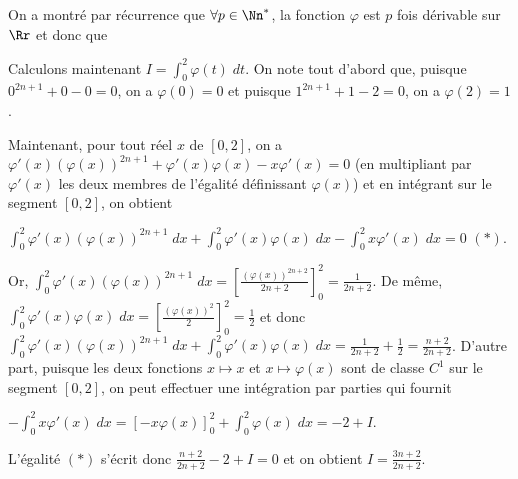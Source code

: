 {{On a montré par récurrence que $\forall p\in\Nn^*$, la fonction $\varphi$ est $p$ fois dérivable sur $\Rr$ et donc que

\begin{center}
\end{center}

Calculons maintenant $I=\int_{0}^{2}\varphi(t)\;dt$. On note tout d'abord que, puisque $0^{2n+1}+0-0=0$, on a $\varphi(0)=0$ et puisque $1^{2n+1}+1-2=0$, on a $\varphi(2)=1$. 

Maintenant, pour tout réel $x$ de $[0,2]$, on a $\varphi'(x)(\varphi(x))^{2n+1}+\varphi'(x)\varphi(x)-x\varphi'(x)=0$ (en multipliant par $\varphi'(x)$ les deux membres de l'égalité définissant $\varphi(x)$) et en intégrant sur le segment $[0,2]$, on obtient

\begin{center}
$\int_{0}^{2}\varphi'(x)(\varphi(x))^{2n+1}\;dx+\int_{0}^{2}\varphi'(x)\varphi(x)\;dx-\int_{0}^{2}x\varphi'(x)\;dx=0$ $(*)$.
\end{center}

Or, $\int_{0}^{2}\varphi'(x)(\varphi(x))^{2n+1}\;dx=\left[ \frac{(\varphi(x))^{2n+2}}{2n+2}\right]_0^2= \frac{1}{2n+2}$. De même, $\int_{0}^{2}\varphi'(x)\varphi(x)\;dx=\left[ \frac{(\varphi(x))^{2}}{2}\right]_0^2= \frac{1}{2}$ et donc $\int_{0}^{2}\varphi'(x)(\varphi(x))^{2n+1}\;dx+\int_{0}^{2}\varphi'(x)\varphi(x)\;dx= \frac{1}{2n+2}+ \frac{1}{2}= \frac{n+2}{2n+2}$. D'autre part, puisque les deux fonctions $x\mapsto x$ et $x\mapsto\varphi(x)$ sont de classe $C^1$ sur le segment $[0,2]$, on peut effectuer une intégration par parties qui fournit

\begin{center}
$-\int_{0}^{2}x\varphi'(x)\;dx=\left[-x\varphi(x)\right]_0^2+\int_{0}^{2}\varphi(x)\;dx=-2+I$.
\end{center}

L'égalité $(*)$ s'écrit donc $ \frac{n+2}{2n+2}-2+I=0$ et on obtient $I= \frac{3n+2}{2n+2}$.

\begin{center}
\end{center}
}
}
